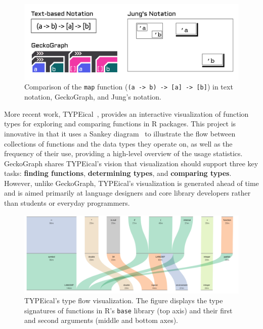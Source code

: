 \documentclass[preprint,12pt]{elsarticle}
\begin{document}
\begin{figure}
  \includegraphics[width=\linewidth]{figures/Jung}
  \caption{
        \label{fig:jung}
        Comparison of the \texttt{map} function (\texttt{(a -> b) -> [a] -> [b]}) in text notation, GeckoGraph, and Jung’s notation.
  }
\end{figure}

More recent work, TYPEical~\cite{Moy2020-tr}, provides an interactive visualization of function types for exploring and comparing functions in R packages. 
This project is innovative in that it uses a Sankey diagram~\cite{Keiderling2012-ag} to illustrate the flow between collections of functions and the data types they operate on, as well as the frequency of their use, providing a high-level overview of the usage statistics. 
GeckoGraph shares TYPEical’s vision that visualization should support three key tasks: \textbf{finding functions}, \textbf{determining types}, and \textbf{comparing types}. 
However, unlike GeckoGraph, TYPEical’s visualization is generated ahead of time and is aimed primarily at language designers and core library developers rather than students or everyday programmers.

\begin{figure}
  \includegraphics[width=\linewidth]{figures/Typical.png}
  \caption{
        \label{fig:typical}
        TYPEical’s type flow visualization. 
        The figure displays the type signatures of functions in R’s \texttt{base} library (top axis) and their first and second arguments (middle and bottom axes).
  }
\end{figure}
\end{document}
